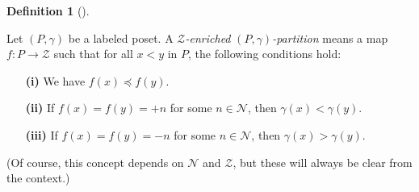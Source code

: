 \documentclass[numbers=enddot,12pt,final,onecolumn,notitlepage]{scrartcl}%
\theoremstyle{definition}
\newtheorem{defi}[theo]{Definition}
\newenvironment{definition}[1][]
{\begin{defi}[#1]\begin{leftbar}}
{\end{leftbar}\end{defi}}
\begin{document}
\begin{definition}
\label{def.ambivPp}Let $\left(  P,\gamma\right)  $ be a labeled poset. A
\textit{$\mathcal{Z}$-enriched }$\left(  P,\gamma\right)  $\textit{-partition}
means a map $f:P\rightarrow\mathcal{Z}$ such that for all $x<y$ in $P$, the
following conditions hold:

\begin{enumerate}
\item[\textbf{(i)}] We have $f\left(  x\right)  \preccurlyeq f\left(
y\right)  $.

\item[\textbf{(ii)}] If $f\left(  x\right)  =f\left(  y\right)  =+n$ for some
$n\in\mathcal{N}$, then $\gamma\left(  x\right)  <\gamma\left(  y\right)  $.

\item[\textbf{(iii)}] If $f\left(  x\right)  =f\left(  y\right)  =-n$ for some
$n\in\mathcal{N}$, then $\gamma\left(  x\right)  >\gamma\left(  y\right)  $.
\end{enumerate}

(Of course, this concept depends on $\mathcal{N}$ and $\mathcal{Z}$, but these
will always be clear from the context.)
\end{definition}

\Needspace{4cm}
\end{document}
